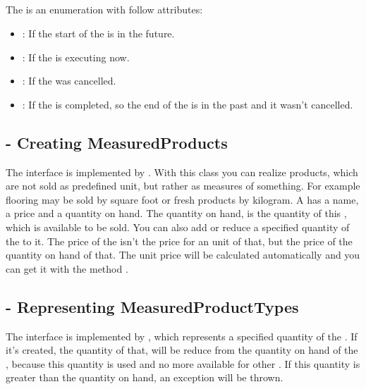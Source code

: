 \subsection{}
The  is an enumeration with follow attributes:
\begin{itemize}
\item {}: If the start of the  is in the future.
\item {}: If the  is executing now.
\item {}: If the  was cancelled.
\item {}: If the  is completed, so the end of the  is in the past and it wasn’t cancelled.
\end{itemize}

\subsection{ - Creating MeasuredProducts}
The interface  is implemented by . With this class you can realize products, which are not sold as predefined unit, but rather 
as measures of something. For example flooring may be sold by square foot or fresh products by kilogram.
A  has a name, a price and a quantity on hand. The quantity on hand, is the quantity of this , which is available to 
be sold. You can also add or reduce a specified quantity of the  to it. 
The price of the  isn’t the price for an unit of that, but the price of the quantity on hand of that. The unit price will be calculated automatically 
and you can get it with the method .

\subsection{ - Representing MeasuredProductTypes}
The interface  is implemented by , which represents a specified quantity of the . If it’s 
created, the quantity of that, will be reduce from the quantity on hand of the , because this quantity is used and no more available for other 
. If this quantity is greater than the quantity on hand, an exception will be thrown.